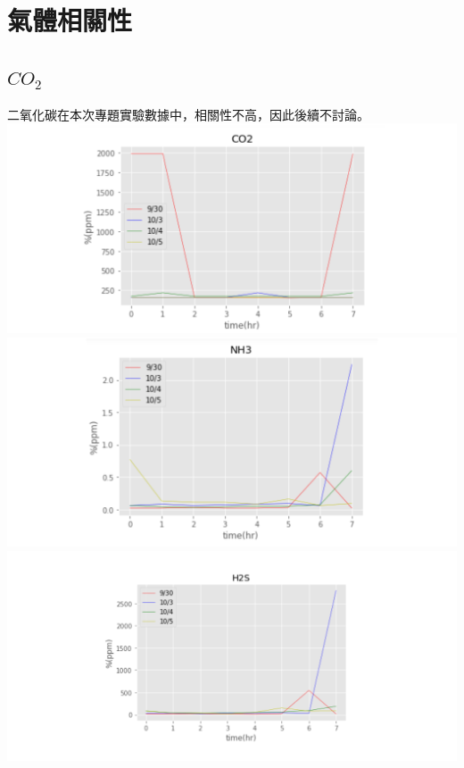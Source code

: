 \section{氣體相關性}
	\subsection{$CO_2$}
		二氧化碳在本次專題實驗數據中，相關性不高，因此後續不討論。
		\\ 
		\includegraphics[width=1.0\textwidth]{pic/CO2.png}
		\\ 
		\includegraphics[width=1.0\textwidth]{pic/NH3.png}
		\\ 
		\includegraphics[width=1.0\textwidth]{pic/H2S.png}
